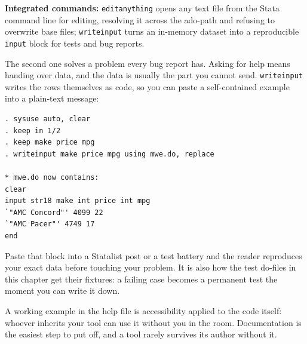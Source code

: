 \documentclass[
    a4paper,
    fontsize=10pt,
    twoside=true,
    numbers=noenddot,
]{kaobook}
\begin{document}
\begin{kaobox}[frametitle=Package Integration: \texttt{editanything} and \texttt{writeinput}]
\textbf{Integrated commands:} \texttt{editanything} opens any text file from the Stata command line for editing, resolving it across the ado-path and refusing to overwrite base files; \texttt{writeinput} turns an in-memory dataset into a reproducible \texttt{input} block for tests and bug reports.

The second one solves a problem every bug report has. Asking for help means handing over data, and the data is usually the part you cannot send. \texttt{writeinput} writes the rows themselves as code, so you can paste a self-contained example into a plain-text message:
\par
{\footnotesize
\begin{verbatim}
. sysuse auto, clear
. keep in 1/2
. keep make price mpg
. writeinput make price mpg using mwe.do, replace

* mwe.do now contains:
clear
input str18 make int price int mpg
`"AMC Concord"' 4099 22
`"AMC Pacer"' 4749 17
end
\end{verbatim}
}
Paste that block into a Statalist post or a test battery and the reader reproduces your exact data before touching your problem. It is also how the test do-files in this chapter get their fixtures: a failing case becomes a permanent test the moment you can write it down.
\end{kaobox}

A working example in the help file is accessibility applied to the code itself: whoever inherits your tool can use it without you in the room. Documentation is the easiest step to put off, and a tool rarely survives its author without it.
\end{document}
